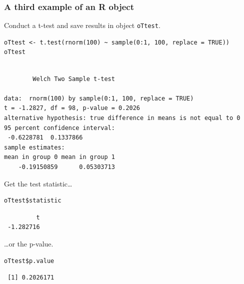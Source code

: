 \documentclass[bigger]{beamer}
\begin{document}
\begin{frame}[fragile,shrink = 20]
\frametitle{A third example of an R object}
\label{sec-1-2-5}

    Conduct a t-test and save results in object \texttt{oTtest}.


\lstset{language=R}
\begin{lstlisting}
oTtest <- t.test(rnorm(100) ~ sample(0:1, 100, replace = TRUE))
oTtest
\end{lstlisting}



\begin{verbatim}

        Welch Two Sample t-test

data:  rnorm(100) by sample(0:1, 100, replace = TRUE) 
t = -1.2827, df = 98, p-value = 0.2026
alternative hypothesis: true difference in means is not equal to 0 
95 percent confidence interval:
 -0.6228781  0.1337866 
sample estimates:
mean in group 0 mean in group 1 
    -0.19150859      0.05303713
\end{verbatim}


Get the test statistic\ldots


\lstset{language=R}
\begin{lstlisting}
oTtest$statistic
\end{lstlisting}

\begin{verbatim}
         t 
 -1.282716
\end{verbatim}

\ldots or the p-value.


\lstset{language=R}
\begin{lstlisting}
oTtest$p.value
\end{lstlisting}

\begin{verbatim}
 [1] 0.2026171
\end{verbatim}
\end{frame}
\end{document}
